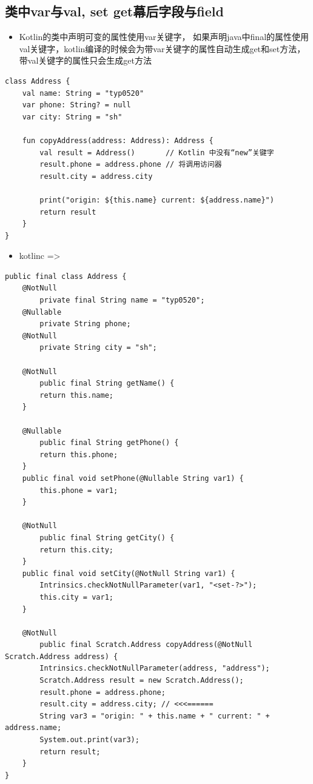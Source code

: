 \documentclass[9pt, b5paper]{article}
\begin{document}
\subsection{类中var与val, set get幕后字段与field}
\label{sec-7-4}
\begin{itemize}
\item Kotlin的类中声明可变的属性使用var关键字， 如果声明java中final的属性使用val关键字，kotlin编译的时候会为带var关键字的属性自动生成get和set方法，带val关键字的属性只会生成get方法
\end{itemize}
\begin{verbatim}
class Address {
    val name: String = "typ0520"
    var phone: String? = null
    var city: String = "sh"

    fun copyAddress(address: Address): Address {
        val result = Address()       // Kotlin 中没有“new”关键字
        result.phone = address.phone // 将调用访问器
        result.city = address.city

        print("origin: ${this.name} current: ${address.name}")
        return result
    }
}
\end{verbatim}
\begin{itemize}
\item kotlinc =>
\end{itemize}
\begin{verbatim}
public final class Address {
    @NotNull
        private final String name = "typ0520";
    @Nullable
        private String phone;
    @NotNull
        private String city = "sh";

    @NotNull
        public final String getName() {
        return this.name;
    }

    @Nullable
        public final String getPhone() {
        return this.phone;
    }
    public final void setPhone(@Nullable String var1) {
        this.phone = var1;
    }

    @NotNull
        public final String getCity() {
        return this.city;
    }
    public final void setCity(@NotNull String var1) {
        Intrinsics.checkNotNullParameter(var1, "<set-?>");
        this.city = var1;
    }

    @NotNull
        public final Scratch.Address copyAddress(@NotNull Scratch.Address address) {
        Intrinsics.checkNotNullParameter(address, "address");
        Scratch.Address result = new Scratch.Address();
        result.phone = address.phone;
        result.city = address.city; // <<<======
        String var3 = "origin: " + this.name + " current: " + address.name;
        System.out.print(var3);
        return result;
    }
}
\end{verbatim}
\end{document}
